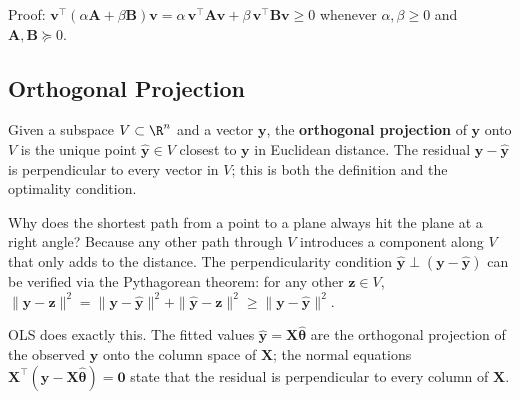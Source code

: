 \documentclass[main.tex]{subfiles}
\begin{document}
Proof: $\mathbf{v}^\top(\alpha\mathbf{A} + \beta\mathbf{B})\mathbf{v} = \alpha\,\mathbf{v}^\top\!\mathbf{A}\mathbf{v} + \beta\,\mathbf{v}^\top\!\mathbf{B}\mathbf{v} \geq 0$ whenever $\alpha, \beta \geq 0$ and $\mathbf{A}, \mathbf{B} \succeq 0$.

\subsection{Orthogonal Projection}

Given a subspace $V \subset \R^n$ and a vector $\mathbf{y}$, the \textbf{orthogonal projection} of $\mathbf{y}$ onto $V$ is the unique point $\hat{\mathbf{y}} \in V$ closest to $\mathbf{y}$ in Euclidean distance. The residual $\mathbf{y} - \hat{\mathbf{y}}$ is perpendicular to every vector in $V$; this is both the definition and the optimality condition.

\begin{center}
\end{center}

Why does the shortest path from a point to a plane always hit the plane at a right angle? Because any other path through $V$ introduces a component along $V$ that only adds to the distance. The perpendicularity condition $\hat{\mathbf{y}} \perp (\mathbf{y} - \hat{\mathbf{y}})$ can be verified via the Pythagorean theorem: for any other $\mathbf{z} \in V$, $\|\mathbf{y} - \mathbf{z}\|^2 = \|\mathbf{y} - \hat{\mathbf{y}}\|^2 + \|\hat{\mathbf{y}} - \mathbf{z}\|^2 \geq \|\mathbf{y} - \hat{\mathbf{y}}\|^2$.

OLS does exactly this. The fitted values $\hat{\mathbf{y}} = \mathbf{X}\hat{\boldsymbol{\theta}}$ are the orthogonal projection of the observed $\mathbf{y}$ onto the column space of $\mathbf{X}$; the normal equations $\mathbf{X}^\top(\mathbf{y} - \mathbf{X}\hat{\boldsymbol{\theta}}) = \mathbf{0}$ state that the residual is perpendicular to every column of $\mathbf{X}$.
\end{document}
